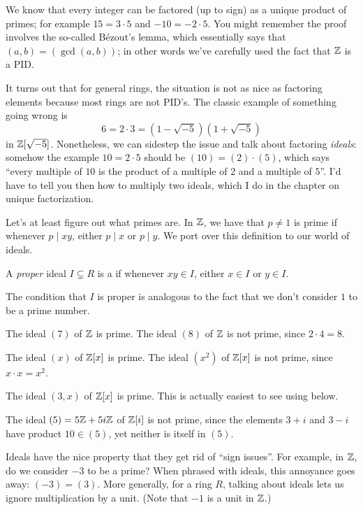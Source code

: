 We know that every integer can be factored (up to sign)
as a unique product of primes; for example $15 = 3 \cdot 5$
and $-10 = -2 \cdot 5$.
You might remember the proof involves the so-called B\'ezout's lemma,
which essentially says that $(a,b) = (\gcd(a,b))$;
in other words we've carefully used the fact that $\mathbb Z$ is a PID.

It turns out that for general rings, the situation is not as nice
as factoring elements because most rings are not PID's.
The classic example of something going wrong is
\[ 6 = 2 \cdot 3 = \left( 1-\sqrt{-5} \right)\left( 1+\sqrt{-5} \right) \]
in $\mathbb Z[\sqrt{-5}]$.
Nonetheless, we can sidestep the issue
and talk about factoring \emph{ideals}:
somehow the example $10 = 2 \cdot 5$ should be $(10) = (2) \cdot (5)$,
which says ``every multiple of $10$ is the product of a
multiple of $2$ and a multiple of $5$''.
I'd have to tell you then how to multiply two ideals, which I do
in the chapter on unique factorization.

Let's at least figure out what primes are.
In $\mathbb Z$, we have that $p \neq 1$ is prime if whenever $p \mid xy$,
either $p \mid x$ or $p \mid y$.
We port over this definition to our world of ideals.
\begin{definition}
	\label{def:prime_ideal}
	A \emph{proper} ideal $I \subsetneq R$ is a 
	if whenever $xy \in I$, either $x \in I$ or $y \in I$.
\end{definition}
The condition that $I$ is proper is analogous to the
fact that we don't consider $1$ to be a prime number.

\begin{example}
	\listhack
	\begin{enumerate}[(a)]
		\ii The ideal $(7)$ of $\mathbb Z$ is prime.
		\ii The ideal $(8)$ of $\mathbb Z$ is not prime,
		since $2 \cdot 4 = 8$.

		\ii The ideal $(x)$ of $\mathbb Z[x]$ is prime.
		\ii The ideal $(x^2)$ of $\mathbb Z[x]$ is not prime,
		since $x \cdot x = x^2$.

		\ii The ideal $(3,x)$ of $\mathbb Z[x]$ is prime.
		This is actually easiest to see
		using  below.

		\ii The ideal $(5) = 5\mathbb Z + 5i\mathbb Z$ of $\mathbb Z[i]$
		is not prime, since the elements
		$3+i$ and $3-i$ have product $10 \in (5)$,
		yet neither is itself in $(5)$.
	\end{enumerate}
\end{example}
\begin{remark}
	\label{rem:unit_sign_issue}
	Ideals have the nice property that they get rid of ``sign issues''.
	For example, in $\mathbb Z$, do we consider $-3$ to be a prime?
	When phrased with ideals, this annoyance goes away: $(-3) = (3)$.
	More generally, for a ring $R$, talking about ideals
	lets us ignore multiplication by a unit.
	(Note that $-1$ is a unit in $\mathbb Z$.)
\end{remark}


